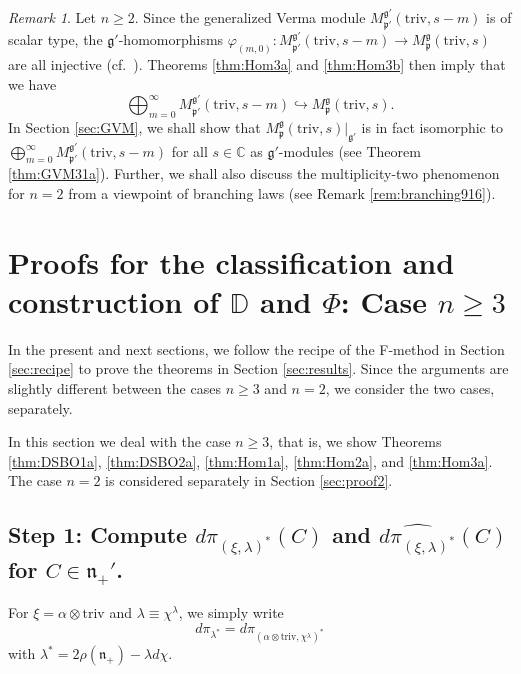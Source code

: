 \documentclass[reqno,11pt]{amsart}
\theoremstyle{remark}
\newtheorem{rem}[equation]{Remark}
\theoremstyle{definition}
\numberwithin{equation}{section}
\newcommand{\fg}{{\mathfrak g}}
\newcommand{\fn}{{\mathfrak n}}
\newcommand{\fp}{{\mathfrak p}}
\newcommand{\C}{\mathbb{C}}
\newcommand{\triv}{\mathrm{triv}}
\newcommand{\dpi}{d\pi}
\newcommand{\Mp}{M^{\fg}_{\fp}}
\newcommand{\Mpp}{M^{\fg'}_{\fp'}}
\newcommand{\bD}{\mathbb{D}}
\begin{document}
\begin{rem}
Let $n\geq 2$.
Since the generalized Verma module $\Mpp(\triv,s-m)$ is of scalar type, 
the $\fg'$-homomorphisms
$\varphi_{(m,0)} \colon \Mpp(\triv,s-m) \to \Mp(\triv, s)$ are all injective
(cf.\ \cite[Prop.\ 9.11]{Hum08}). Theorems \ref{thm:Hom3a} and \ref{thm:Hom3b} then 
imply that we have
\begin{equation}\label{eqn:GVM04}
\bigoplus_{m=0}^\infty \Mpp(\triv,s-m)
\hookrightarrow
\Mp(\triv, s).
\end{equation}
In Section \ref{sec:GVM}, we shall show that
$\Mp(\triv, s)\vert_{\fg'}$
is in fact isomorphic to 
$\bigoplus_{m=0}^\infty \Mpp(\triv,s-m)$
for all $s \in \C$ as $\fg'$-modules
 (see Theorem \ref{thm:GVM31a}). Further, we shall also discuss the 
 multiplicity-two phenomenon for $n=2$ from 
 a viewpoint of branching laws (see Remark \ref{rem:branching916}).
\end{rem}


\section{Proofs for the classification and construction of $\bD$ and $\Phi$:
Case $n\geq 3$}
\label{sec:proof1}

In the present and next sections, 
we follow the recipe of the F-method in Section \ref{sec:recipe}
to prove the theorems in Section \ref{sec:results}.
Since the arguments are slightly different between
the cases $n\geq 3$ and $n=2$, we consider the two cases, separately.

In this section we deal with the case $n\geq 3$, that is, we show 
Theorems \ref{thm:DSBO1a}, \ref{thm:DSBO2a}, \ref{thm:Hom1a}, 
 \ref{thm:Hom2a}, and \ref{thm:Hom3a}. The case $n=2$ is considered separately
in Section \ref{sec:proof2}.

\subsection{Step 1: 
Compute $d\pi_{(\xi,\lambda)^*}(C)$ and 
$\widehat{d\pi_{(\xi,\lambda)^*}}(C)$
for $C \in \fn_+'$.}
\label{sec:Step1}

For $\xi = \alpha \otimes \triv$ and $\lambda \equiv \chi^\lambda$, 
we simply write
\begin{equation*}
\dpi_{\lambda^*} = \dpi_{(\alpha\otimes\triv,\chi^\lambda)^*}
\end{equation*}
with $\lambda^*=2\rho(\fn_+)-\lambda d\chi$. 
\end{document}
